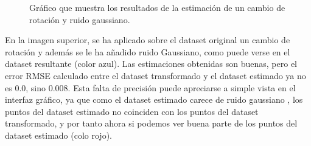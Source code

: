 \begin{figure}
\begin{center}
\hspace{0.5cm}

\end{center}

\caption{Gráfico que muestra los resultados de la estimación de un cambio de rotación y ruido gaussiano.}
\end{figure}
En la imagen superior, se ha aplicado sobre el dataset original un cambio de rotación y además se le ha añadido ruido Gaussiano, como puede verse en el dataset resultante (color azul). Las estimaciones obtenidas son buenas, pero el error RMSE calculado entre el dataset transformado y el dataset estimado ya no es 0.0, sino 0.008. Esta falta de precisión puede apreciarse a simple vista en el interfaz gráfico, ya que como el dataset estimado carece de ruido gaussiano , los puntos del dataset estimado no coinciden con los puntos del dataset transformado, y por tanto ahora si podemos ver buena parte de los puntos del dataset estimado (colo rojo).




